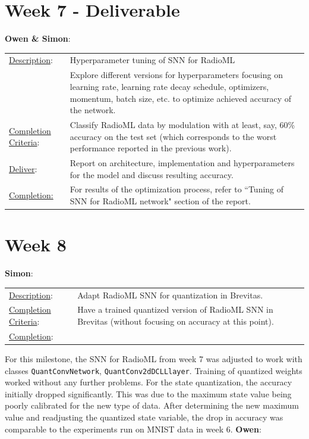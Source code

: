 \documentclass[parskip=true, 10pt]{scrartcl}
\begin{document}
\section*{Week 7 - Deliverable}

\textsf{\textbf{Owen \& Simon}}:

\begin{tabularx}{\textwidth}{p{3.5cm} p{10cm}}
\underline{Description}: & Hyperparameter tuning of SNN for RadioML\\

& Explore different versions for hyperparameters focusing on learning rate, learning rate decay schedule, optimizers, momentum, batch size, etc. to optimize achieved accuracy of the network.\\

\underline{Completion Criteria}: & Classify RadioML data by modulation with at least, say, 60\% accuracy on the test set (which corresponds to the worst performance reported in the previous work).\\

\underline{Deliver}: & Report on architecture, implementation and hyperparameters for the model and discuss resulting accuracy.\\
\underline{Completion:}& For results of the optimization process, refer to ``Tuning of SNN for RadioML network" section of the report.
\end{tabularx}

\section*{Week 8}

\textsf{\textbf{Simon}}:

\begin{tabularx}{\textwidth}{p{3.5cm} p{10cm}}
\underline{Description}: & Adapt RadioML SNN for quantization in Brevitas.\\

\underline{Completion Criteria}: & Have a trained quantized version of RadioML SNN in Brevitas (without focusing on accuracy at this point).\\
\underline{Completion}: &
\end{tabularx}

For this milestone, the SNN for RadioML from week 7 was adjusted to work with classes \texttt{QuantConvNetwork}, \texttt{QuantConv2dDCLLlayer}. Training of quantized weights worked without any further problems. For the state quantization, the accuracy initially dropped significantly. This was due to the maximum state value being poorly calibrated for the new type of data. After determining the new maximum value and readjusting the quantized state variable, the drop in accuracy was comparable to the experiments run on MNIST data in week 6.
\newpage
\textsf{\textbf{Owen}}:
\end{document}
